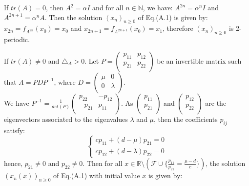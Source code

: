 \documentclass[11pt]{amsart}
\theoremstyle{definition}
\theoremstyle{remark}
\theoremstyle{example}
\numberwithin{equation}{section}
\begin{document}
\begin{description}[leftmargin=*]
\item[(1)] If $tr(A)=0$, then $A^2=\alpha I$ and for all $n\in\mathbb{N}$,
  we have: $A^{2n}=\alpha^nI$ and $A^{2n+1}=\alpha^nA$. Then the solution $(x_n)_{n\geq0}$ of Eq.(A.1) is given by: $x_{2n}=f_{A^{2n}}(x_0)=x_0$ and $x_{2n+1}=f_{A^{2n+1}}(x_0)=x_1$, therefore $(x_n)_{n\geq0}$ is 2-periodic.
\item[(2)-(i)] If $tr(A)\neq0$ and $\triangle_A>0$.
  Let $P=\left(\begin{array}{cc}
  p_{11} & p_{12}\\
  p_{21} & p_{22} \\
\end{array}\right)$ be an invertible matrix such that $A=PDP^{-1}$,
  where $D=\left(\begin{array}{cc}
  \mu & 0\\
   0 & \lambda \\
\end{array}\right)$.\\
We have $P^{-1} = \frac{1}{det(P)}\left(\begin{array}{cc}
                                                   p_{22} & -p_{12}\\
                                                  -p_{21} & p_{11} \\
                                                 \end{array}
                                               \right)$.
As $\left(\begin{array}{c}
              p_{11} \\
              p_{21} \\
\end{array}\right)$ and
$\left(\begin{array}{c}
              p_{12} \\
              p_{22} \\
\end{array}\right)$
are the eigenvectors associated to the eigenvalues $\lambda$ and $\mu$, then the coefficients $p_{ij}$ satisfy:
$$\left\{\begin{array}{c}
cp_{11}+(d-\mu)p_{21}=0 \\
 cp_{12}+(d-\lambda)p_{22}=0
\end{array}\right.$$
hence, $p_{21}\neq0$ and $p_{22}\neq0$.
Then for all $x\in\mathbb{R}\setminus(\mathcal{F}\cup\{\frac{p_{11}}{p_{21}}=\frac{\mu-d}{c}\})$, the solution $(x_n(x))_{n\geq0}$ of  Eq.(A.1) with initial value $x$ is given by:

\end{description}
\end{document}
